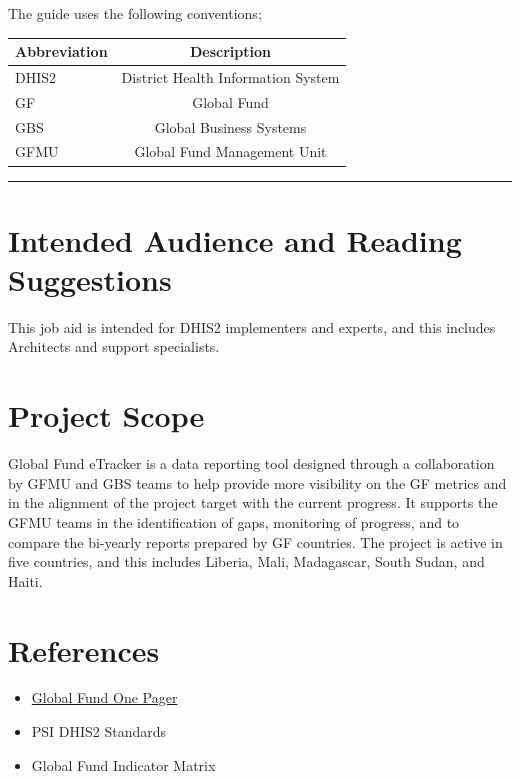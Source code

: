 \documentclass[]{book}
\providecommand{\tightlist}{%
  \setlength{\itemsep}{0pt}\setlength{\parskip}{0pt}}
\begin{document}
The guide uses the following conventions;

\begin{longtable}[]{@{}lc@{}}
\toprule
\textbf{Abbreviation} & \textbf{Description}\tabularnewline
\midrule
\endhead
DHIS2 & District Health Information System\tabularnewline
GF & Global Fund\tabularnewline
GBS & Global Business Systems\tabularnewline
GFMU & Global Fund Management Unit\tabularnewline
\bottomrule
\end{longtable}

\begin{center}\rule{0.5\linewidth}{\linethickness}\end{center}

\hypertarget{intended-audience-and-reading-suggestions}{%
\section{Intended Audience and Reading Suggestions}\label{intended-audience-and-reading-suggestions}}

This job aid is intended for DHIS2 implementers and experts, and this includes Architects and support specialists.

\hypertarget{project-scope}{%
\section{Project Scope}\label{project-scope}}

Global Fund eTracker is a data reporting tool designed through a collaboration by GFMU and GBS teams to help provide more visibility on the GF metrics and in the alignment of the project target with the current progress. It supports the GFMU teams in the identification of gaps, monitoring of progress, and to compare the bi-yearly reports prepared by GF countries. The project is active in five countries, and this includes Liberia, Mali, Madagascar, South Sudan, and Haiti.

\hypertarget{references}{%
\section{References}\label{references}}

\begin{itemize}
\tightlist
\item
  \href{https://psiorg.sharepoint.com/:w:/r/sites/us_globalfunde-tracker/_layouts/15/Doc.aspx?sourcedoc=\%7B9D6D6FC8-7EC5-4D8C-8031-7EF2CF247D7E\%7D\&file=GF\%20Tracker\%20One-Pager.docx\&action=default\&mobileredirect=true}{Global Fund One Pager}
\item
  PSI DHIS2 Standards
\item
  Global Fund Indicator Matrix
\end{itemize}
\end{document}

